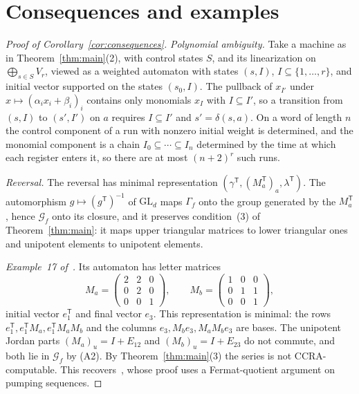 \documentclass[acmlarge,screen,11pt,nonacm,natbib=false]{acmart}
\newcommand{\cG}{\mathcal{G}}
\newcommand{\GL}{\mathrm{GL}}
\theoremstyle{definition}
\begin{document}
\section{Consequences and examples}\label{sec:consequences}
\begin{proof}[Proof of Corollary~\ref{cor:consequences}]
\emph{Polynomial ambiguity.} Take a machine as in Theorem~\ref{thm:main}(2), with control states $S$, and its linearization on $\bigoplus_{s\in S}V_r$, viewed as a weighted automaton with states $(s,I)$, $I\subseteq\{1,\ldots,r\}$, and initial vector supported on the states $(s_0,I)$. The pullback of $x_{I'}$ under $x\mapsto(\alpha_ix_i+\beta_i)_i$ contains only monomials $x_I$ with $I\subseteq I'$, so a transition from $(s,I)$ to $(s',I')$ on $a$ requires $I\subseteq I'$ and $s'=\delta(s,a)$. On a word of length $n$ the control component of a run with nonzero initial weight is determined, and the monomial component is a chain $I_0\subseteq\cdots\subseteq I_n$ determined by the time at which each register enters it, so there are at most $(n+2)^r$ such runs.

\emph{Reversal.} The reversal has minimal representation $(\gamma^{\mathsf T},(M_a^{\mathsf T})_a,\lambda^{\mathsf T})$. The automorphism $g\mapsto(g^{\mathsf T})^{-1}$ of $\GL_d$ maps $\Gamma_f$ onto the group generated by the $M_a^{\mathsf T}$, hence $\cG_f$ onto its closure, and it preserves condition~(3) of Theorem~\ref{thm:main}: it maps upper triangular matrices to lower triangular ones and unipotent elements to unipotent elements.

\emph{Example~17 of~\cite{MPSfull}.} Its automaton has letter matrices
\[
M_a=\begin{pmatrix}2&2&0\\0&2&0\\0&0&1\end{pmatrix},\qquad
M_b=\begin{pmatrix}1&0&0\\0&1&1\\0&0&1\end{pmatrix},
\]
initial vector $e_1^{\mathsf T}$ and final vector $e_3$. This representation is minimal: the rows $e_1^{\mathsf T},e_1^{\mathsf T}M_a,e_1^{\mathsf T}M_aM_b$ and the columns $e_3,M_be_3,M_aM_be_3$ are bases. The unipotent Jordan parts $(M_a)_u=I+E_{12}$ and $(M_b)_u=I+E_{23}$ do not commute, and both lie in $\cG_f$ by (A2). By Theorem~\ref{thm:main}(3) the series is not CCRA-computable. This recovers~\cite[Theorem~18]{MPSfull}, whose proof uses a Fermat-quotient argument on pumping sequences.
\end{proof}
\end{document}
